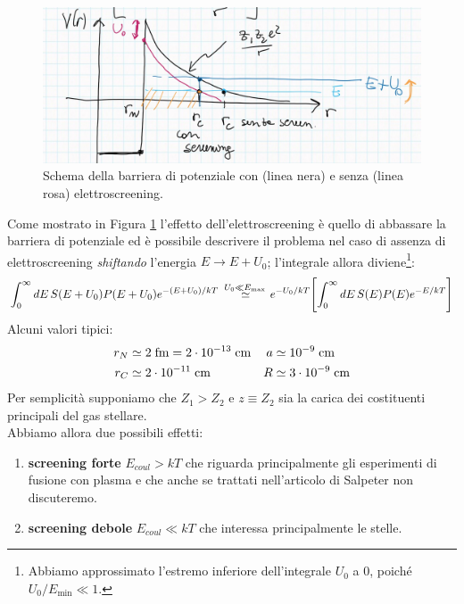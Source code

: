 \begin{figure}[!h]
    \centering
    \includegraphics[scale=0.3]{Immagini/0329_pot_ES.png}
    \caption{Schema della barriera di potenziale con (linea nera) e senza (linea rosa) elettroscreening.}
    \label{0329_schema}
\end{figure}
\noindent Come mostrato in Figura \ref{0329_schema} l'effetto dell'elettroscreening è quello di abbassare la barriera di potenziale ed è possibile descrivere il problema nel caso di assenza di elettroscreening \textit{shiftando} l'energia $E\to E+U_0$; l'integrale allora diviene\footnote{Abbiamo approssimato l'estremo inferiore dell'integrale $U_0$ a 0, poiché $U_0/E_{\min{}}\ll1$.}:
$$\int_0^\infty dE\, S(E+U_0) P(E+U_0) e^{-(E+U_0)/kT}\: \stackrel{U_0\ll E_{\max{}}}{\simeq} e^{-U_0/kT}\Biggl [ \int_0^\infty dE\, S(E) P(E) e^{-E/kT} \Biggr ]$$
Alcuni valori tipici:
\begin{displaymath}
\begin{aligned}
r_N &\simeq 2\;\mbox{fm} = 2\cdot10^{-13}\;\mbox{cm} & a   &\simeq 10^{-9}\;\mbox{cm}\\
r_C &\simeq 2\cdot10^{-11}\;\mbox{cm} & R   &\simeq 3\cdot10^{-9}\;\mbox{cm}
\end{aligned}
\end{displaymath}
Per semplicità supponiamo che $Z_1>Z_2$ e $z\equiv Z_2$ sia la carica dei costituenti principali del gas stellare.\\ Abbiamo allora due possibili effetti:
\begin{enumerate}
    \item \textbf{screening forte} $E_{coul} > kT$ che riguarda principalmente gli esperimenti di fusione con plasma e che anche se trattati nell'articolo di Salpeter non discuteremo.
    \item \textbf{screening debole} $E_{coul}\ll kT$ che interessa principalmente le stelle.
\end{enumerate}

